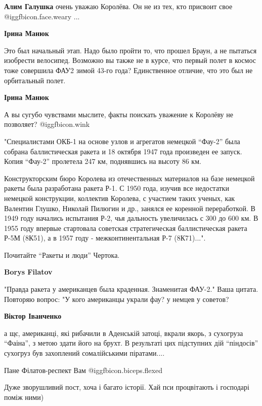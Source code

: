 \begin{itemize}
\begin{itemize}
\textbf{Алим Галушка} очень уважаю Королёва. Он не из тех, кто присвоит свое @igg{fbicon.face.weary} ...

\textbf{Ірина Манюк} 

Это был начальный этап. Надо было пройти то, что прошел Браун, а не пытаться
изобрести велосипед. Возможно вы также не в курсе, что первый полет в космос
тоже совершила ФАУ2 зимой 43-го года? Единственное отличие, что это был не
орбитальный полет.

\textbf{Ірина Манюк} 

А вы сугубо чувствами мыслите, факты поискать уважение к Королёву не позволяет?
 @igg{fbicon.wink} 

"Специалистами ОКБ-1 на основе узлов и агрегатов немецкой 
\enquote{Фау-2} была собрана
баллистическая ракета и 18 октября 1947 года произведен ее запуск. Копия
\enquote{Фау-2} пролетела 247 км, поднявшись на высоту 86 км.

Конструкторским бюро Королева из отечественных материалов на базе немецкой
ракеты была разработана ракета Р-1. С 1950 года, изучив все недостатки немецкой
конструкции, коллектив Королева, с участием таких ученых, как Валентин Глушко,
Николай Пилюгин и др., занялся ее коренной переработкой. В 1949 году начались
испытания Р-2, чья дальность увеличилась с 300 до 600 км. В 1955 году впервые
стартовала советская стратегическая баллистическая ракета Р-5М (8К51), а в 1957
году - межконтинентальная Р-7 (8К71)...".

Почитайте \enquote{Ракеты и люди} Чертока.

\textbf{Borys Filatov}

"Правда ракета у американцев была краденная.
Знаменитая ФАУ-2."
Ваша цитата.
Повторяю вопрос:
"У кого американцы украли фау? у немцев у советов?

\textbf{Віктор Іванченко} 

а щє, американці, які рибачили в Аденській затоці, вкрали якорь, з сухогруза
\enquote{Фаіна}, з метою здати його на брухт. В результаті цих підступних дій
\enquote{піндосів} сухогруз був захоплений сомалійськими піратами....

Пане Філатов-респект Вам @igg{fbicon.biceps.flexed} 

\end{itemize} %

Дуже зворушливий пост, хоча і багато історії. Хай пси процвітають і господарі поміж ними)


\end{itemize}
